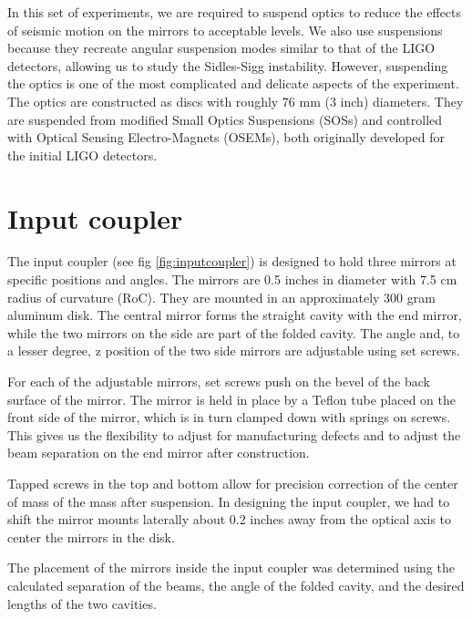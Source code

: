 In this set of experiments, we are required to suspend optics to reduce the effects of seismic motion on the mirrors to acceptable levels. 
We also use suspensions because they recreate angular suspension modes similar to that of the LIGO detectors, allowing us to study the Sidles-Sigg instability.
However, suspending the optics is one of the most complicated and delicate aspects of the experiment.
The optics are constructed as discs with roughly 76 mm (3 inch) diameters. 
They are suspended from modified Small Optics Suspensions (SOSs) and controlled with Optical Sensing Electro-Magnets (OSEMs), both originally developed for the initial LIGO detectors.

\section{Input coupler}

The input coupler (see fig \ref{fig:inputcoupler}) is designed to hold three mirrors at specific positions and angles. The mirrors are 0.5 inches in diameter with 7.5 cm radius of curvature (RoC). They are mounted in an approximately 300 gram aluminum disk.
The central mirror forms the straight cavity with the end mirror, while the two mirrors on the side are part of the folded cavity. 
The angle and, to a lesser degree, z position of the two side mirrors are adjustable using set screws. 
 
For each of the adjustable mirrors, set screws push on the bevel of the back surface of the mirror. 
The mirror is held in place by a Teflon tube placed on the front side of the mirror, which is in turn clamped down with springs on screws.
This gives us the flexibility to adjust for manufacturing defects and to adjust the beam separation on the end mirror after construction.

Tapped screws in the top and bottom allow for precision correction of the center of mass of the mass after suspension.
In designing the input coupler, we had to shift the mirror mounts laterally about 0.2 inches away from the optical axis to center the mirrors in the disk.

The placement of the mirrors inside the input coupler was determined using the calculated separation of the beams, the angle of the folded cavity, and the desired lengths of the two cavities. 

